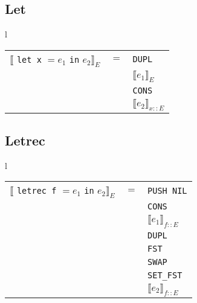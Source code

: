 \documentclass[12pt]{article}
\begin{document}
\subsection*{Let}

\begin{tabular}{l}

\begin{tabular}{ccl}
    $\llbracket$ \texttt{let x} $= e_1$ \texttt{in} $e_2 \rrbracket_{E}$ & $=$ & \texttt{DUPL}\\
    & & $\llbracket e_1 \rrbracket_{E}$\\
    & & \texttt{CONS}\\
    & & $\llbracket e_2 \rrbracket_{x::E}$\\
\end{tabular}
            
\end{tabular}

\subsection*{Letrec}

\begin{tabular}{l}

\begin{tabular}{ccl}
    $\llbracket$ \texttt{letrec f} $= e_1$ \texttt{in} $e_2 \rrbracket_{E}$ & $=$ & \texttt{PUSH NIL}\\
    & & \texttt{CONS}\\
    & & $\llbracket e_1 \rrbracket_{f::E}$\\
    & & \texttt{DUPL}\\
    & & \texttt{FST}\\
    & & \texttt{SWAP}\\
    & & \texttt{SET\_FST}\\
    & & $\llbracket e_2 \rrbracket_{f::E}$\\
\end{tabular}
            
\end{tabular}
\end{document}
